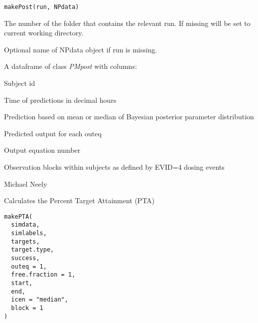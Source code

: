 \documentclass[a4paper]{book}
\begin{document}
%
\begin{Usage}
\begin{verbatim}
makePost(run, NPdata)
\end{verbatim}
\end{Usage}
%
\begin{Arguments}
\begin{ldescription}
\item[\code{run}] The number of the folder that contains the relevant run.  If missing will be
set to current working directory.

\item[\code{NPdata}] Optional name of NPdata object if run is missing.
\end{ldescription}
\end{Arguments}
%
\begin{Value}
A dataframe of class \emph{PMpost} with columns:
\begin{ldescription}
\item[\code{id}]  Subject id
\item[\code{time}]  Time of predictions in decimal hours
\item[\code{icen}]  Prediction based on mean or median of Bayesian posterior parameter distribution
\item[\code{pred}]  Predicted output for each outeq
\item[\code{outeq}]  Output equation number
\item[\code{block}]  Observation blocks within subjects as defined by EVID=4 dosing events
\end{ldescription}
\end{Value}
%
\begin{Author}\relax
Michael Neely
\end{Author}
%
\begin{Description}\relax
Calculates the Percent Target Attainment (PTA)
\end{Description}
%
\begin{Usage}
\begin{verbatim}
makePTA(
  simdata,
  simlabels,
  targets,
  target.type,
  success,
  outeq = 1,
  free.fraction = 1,
  start,
  end,
  icen = "median",
  block = 1
)
\end{verbatim}
\end{Usage}
%
\end{document}
